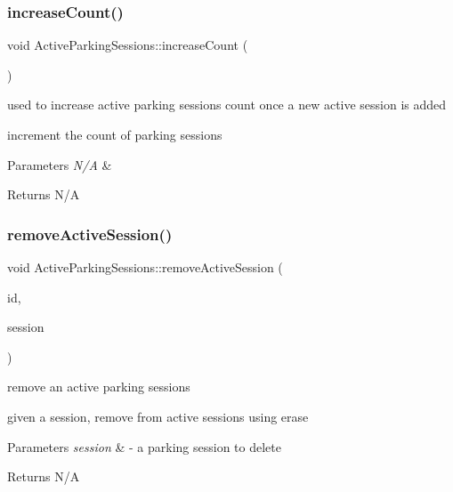 \subsubsection{\texorpdfstring{increase\+Count()}{increaseCount()}}
{\footnotesize\ttfamily void Active\+Parking\+Sessions\+::increase\+Count (\begin{DoxyParamCaption}{ }\end{DoxyParamCaption})\hspace{0.3cm}{\ttfamily [private]}}



used to increase active parking sessions count once a new active session is added 

increment the count of parking sessions


\begin{DoxyParams}{Parameters}
{\em N/A} & \\
\hline
\end{DoxyParams}
\begin{DoxyReturn}{Returns}
N/A 
\end{DoxyReturn}
\mbox{\label{class_active_parking_sessions_a5fca1c37eb394caa299ca5433e648051}} 
\subsubsection{\texorpdfstring{remove\+Active\+Session()}{removeActiveSession()}}
{\footnotesize\ttfamily void Active\+Parking\+Sessions\+::remove\+Active\+Session (\begin{DoxyParamCaption}\item[{int}]{id,  }\item[{\mbox{\hyperlink{class_parking_session}{Parking\+Session}}}]{session }\end{DoxyParamCaption})}



remove an active parking sessions 

given a session, remove from active sessions using erase


\begin{DoxyParams}{Parameters}
{\em session} & -\/ a parking session to delete \\
\hline
\end{DoxyParams}
\begin{DoxyReturn}{Returns}
N/A 
\end{DoxyReturn}


